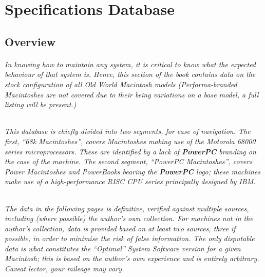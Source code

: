
\part{Specifications Database}

\chapter{Overview}

\paragraph{%
In knowing how to maintain any system, it is critical to know what the expected %
behaviour of that system is. Hence, this section of the book contains data on the %
stock configuration of all Old World Macintosh models (Performa-branded %
Macintoshes are not covered due to their being variations on a base model, %
a full listing will be present.) %
}

\paragraph{%
This database is chiefly divided into two segments, for ease of navigation. The %
first, ``68k Macintoshes'', covers Macintoshes making use of the Motorola 68000 %
series microprocessors. These are identified by a lack of \textsl{\textbf{\textrm{PowerPC}}} %
branding on the case of the machine. The second segment, ``PowerPC Macintoshes'', %
covers Power Macintoshes and PowerBooks bearing the \textsl{\textbf{\textrm{PowerPC}}} logo; %
these machines make use of a high-performance RISC CPU series principally designed by IBM. %
}

\paragraph{%
The data in the following pages is definitive, verified against multiple sources, including %
(where possible) the author's own collection. For machines not in the author's collection, %
data is provided based on at least two sources, three if possible, in order to minimise the %
risk of false information. The only disputable data is what constitutes the ``Optimal'' %
System Software version for a given Macintosh; this is based on the author's own %
experience and is entirely arbitrary. Caveat lector, your mileage may vary. %
}

\cleardoublepage


\cleardoublepage
